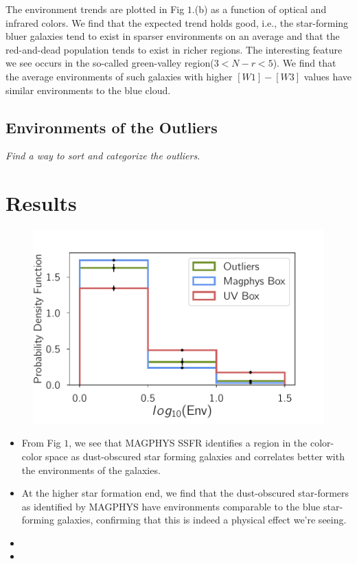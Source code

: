 \documentclass[iop]{emulateapj}
\begin{document}
The environment trends are plotted in Fig $1.$(b) as a function of optical and infrared colors. We find that the expected trend holds good, i.e., the star-forming bluer galaxies tend to exist in sparser environments on an average and that the red-and-dead population tends to exist in richer regions. The interesting feature we see occurs in the so-called green-valley region($3 <N-r < 5$). We find that the average environments of such galaxies with higher $[W1]-[W3]$ values have similar environments to the blue cloud.\\


\subsection{Environments of the Outliers}

\emph{Find a way to sort and categorize the outliers.}

\vspace{100px}

\section{Results}
\begin{figure}
	\centering
		\includegraphics[width = 9 cm, height = 6.0 cm]{jk_plot.pdf}
	\caption{} 
\end{figure}



\begin{itemize}
\item{From Fig $1$, we see that MAGPHYS SSFR identifies a region in the color-color space as dust-obscured star forming galaxies and correlates better with the environments of the galaxies.}
\item{At the higher star formation end, we find that the dust-obscured star-formers as identified by MAGPHYS have environments comparable to the blue star-forming galaxies, confirming that this is indeed a physical effect we're seeing.}

\item{}
\item{}
\end{itemize}
\end{document}
